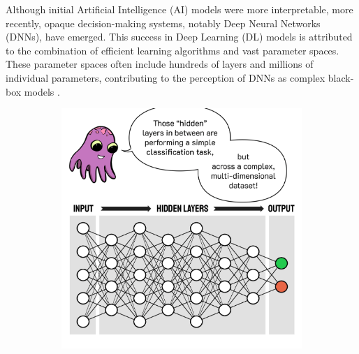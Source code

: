 Although initial Artificial Intelligence (AI) models were more interpretable, more recently, opaque decision-making systems, notably Deep Neural Networks (DNNs), have emerged. This success in Deep Learning (DL) models is attributed to the combination of efficient learning algorithms and vast parameter spaces. These parameter spaces often include hundreds of layers and millions of individual parameters, contributing to the perception of DNNs as complex black-box models \citep{arrieta2020explainable}.

\begin{figure}[h]
  \centering
  \begin{subfigure}[b]{0.45\textwidth}
    \centering
    \includegraphics[width=\textwidth]{images/dnn-1.png}
    \label{fig:image1}
  \end{subfigure}
  \hfill
  \begin{subfigure}[b]{0.45\textwidth}
    \centering

\end{subfigure}
\end{figure}
